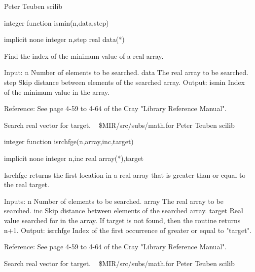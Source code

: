 \newline {} Peter Teuben
\newline {} scilib
\par{\tenpoint
{\eightpoint\begintt
        integer function ismin(n,data,step)

        implicit none
        integer n,step
        real data(*)

  Find the index of the minimum value of a real array.

  Input:
    n          Number of elements to be searched.
    data       The real array to be searched.
    step       Skip distance between elements of the searched array.
  Output:
    ismin      Index of the minimum value in the array.

  Reference:
  See page 4-59 to 4-64 of the Cray "Library Reference Manual".
\endtt}
\par}
%
\noindent Search real vector for target.
\newline \ 
\newline {} \$MIR/src/subs/math.for
\newline {} Peter Teuben
\newline {} scilib
\par{\tenpoint
{\eightpoint\begintt
        integer function isrchfge(n,array,inc,target)

        implicit none
        integer n,inc
        real array(*),target

  Isrchfge returns the first location in a real array that is greater
  than or equal to the real target.

  Inputs:
    n          Number of elements to be searched.
    array      The real array to be searched.
    inc        Skip distance between elements of the searched array.
    target     Real value searched for in the array. If target is not
               found, then the routine returns n+1.
  Output:
    isrchfge   Index of the first occurrence of greater or equal to "target".

  Reference:
  See page 4-59 to 4-64 of the Cray "Library Reference Manual".
\endtt}
\par}
%
\noindent Search real vector for target.
\newline \ 
\newline {} \$MIR/src/subs/math.for
\newline {} Peter Teuben
\newline \abox{Keywords:} scilib
